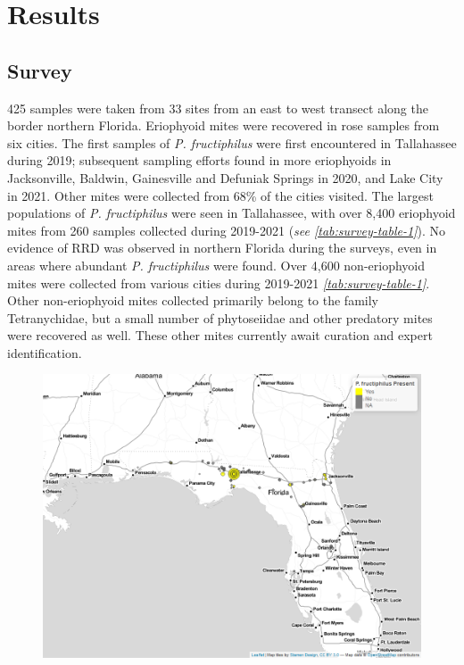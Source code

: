 \documentclass[12pt,final,CPage]{ufthesis}
\begin{document}
{  \hypertarget{results-survey-pheno}{%
  \section{Results}\label{results-survey-pheno}}

  \hypertarget{results-survey}{%
  \subsection{Survey}\label{results-survey}}

  425 samples were taken from 33 sites from an east to west transect along the border northern Florida. Eriophyoid mites were recovered in rose samples from six cities. The first samples of \emph{P. fructiphilus} were first encountered in Tallahassee during 2019; subsequent sampling efforts found in more eriophyoids in Jacksonville, Baldwin, Gainesville and Defuniak Springs in 2020, and Lake City in 2021. Other mites were collected from 68\% of the cities visited. The largest populations of \emph{P. fructiphilus} were seen in Tallahassee, with over 8,400 eriophyoid mites from 260 samples collected during 2019-2021 (\emph{see \ref{tab:survey-table-1}}). No evidence of RRD was observed in northern Florida during the surveys, even in areas where abundant \emph{P. fructiphilus} were found. Over 4,600 non-eriophyoid mites were collected from various cities during 2019-2021 \emph{\ref{tab:survey-table-1}}. Other non-eriophyoid mites collected primarily belong to the family Tetranychidae, but a small number of phytoseiidae and other predatory mites were recovered as well. These other mites currently await curation and expert identification.

  \FloatBarrier
  \begin{figure}[p]

  {\centering \includegraphics[width=1\linewidth]{figure/rrv_survey_map_fl_pf} 

}
\end{figure}}
\end{document}
